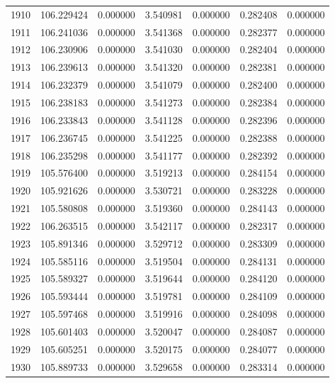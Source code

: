\begin{tabular}{rrrrrrr}
1910 & 106.229424 &    0.000000 &  3.540981 &    0.000000 &    0.282408 &  0.000000 \\
1911 & 106.241036 &    0.000000 &  3.541368 &    0.000000 &    0.282377 &  0.000000 \\
1912 & 106.230906 &    0.000000 &  3.541030 &    0.000000 &    0.282404 &  0.000000 \\
1913 & 106.239613 &    0.000000 &  3.541320 &    0.000000 &    0.282381 &  0.000000 \\
1914 & 106.232379 &    0.000000 &  3.541079 &    0.000000 &    0.282400 &  0.000000 \\
1915 & 106.238183 &    0.000000 &  3.541273 &    0.000000 &    0.282384 &  0.000000 \\
1916 & 106.233843 &    0.000000 &  3.541128 &    0.000000 &    0.282396 &  0.000000 \\
1917 & 106.236745 &    0.000000 &  3.541225 &    0.000000 &    0.282388 &  0.000000 \\
1918 & 106.235298 &    0.000000 &  3.541177 &    0.000000 &    0.282392 &  0.000000 \\
1919 & 105.576400 &    0.000000 &  3.519213 &    0.000000 &    0.284154 &  0.000000 \\
1920 & 105.921626 &    0.000000 &  3.530721 &    0.000000 &    0.283228 &  0.000000 \\
1921 & 105.580808 &    0.000000 &  3.519360 &    0.000000 &    0.284143 &  0.000000 \\
1922 & 106.263515 &    0.000000 &  3.542117 &    0.000000 &    0.282317 &  0.000000 \\
1923 & 105.891346 &    0.000000 &  3.529712 &    0.000000 &    0.283309 &  0.000000 \\
1924 & 105.585116 &    0.000000 &  3.519504 &    0.000000 &    0.284131 &  0.000000 \\
1925 & 105.589327 &    0.000000 &  3.519644 &    0.000000 &    0.284120 &  0.000000 \\
1926 & 105.593444 &    0.000000 &  3.519781 &    0.000000 &    0.284109 &  0.000000 \\
1927 & 105.597468 &    0.000000 &  3.519916 &    0.000000 &    0.284098 &  0.000000 \\
1928 & 105.601403 &    0.000000 &  3.520047 &    0.000000 &    0.284087 &  0.000000 \\
1929 & 105.605251 &    0.000000 &  3.520175 &    0.000000 &    0.284077 &  0.000000 \\
1930 & 105.889733 &    0.000000 &  3.529658 &    0.000000 &    0.283314 &  0.000000 \\

\end{tabular}
